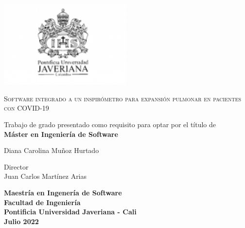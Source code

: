 \begin{titlepage}
	\centering
	\includegraphics[width=0.5\textwidth]{logo}\par\vspace{1cm}
	{\scshape\large Software integrado a un inspirómetro para expansi\'on pulmonar en pacientes con COVID-19 \par}
	\vspace{2cm}
	{ Trabajo de grado presentado como requisito para optar por el título de \\
    \textbf{Máster en Ingeniería de Software}\par}
	\vspace{1.5cm}
	
	{ Diana Carolina Mu\~noz Hurtado\par}
	\vspace{0.2cm}
	Director\\
	Juan Carlos Mart\'inez Arias

	\vspace{2cm}
    
    {\bfseries Maestría en Ingener\'ia de Software \\
    Facultad de Ingenier\'ia\\
    Pontificia Universidad Javeriana - Cali\\
    \vspace{1.2cm}
    Julio 2022\par}
    
\end{titlepage}